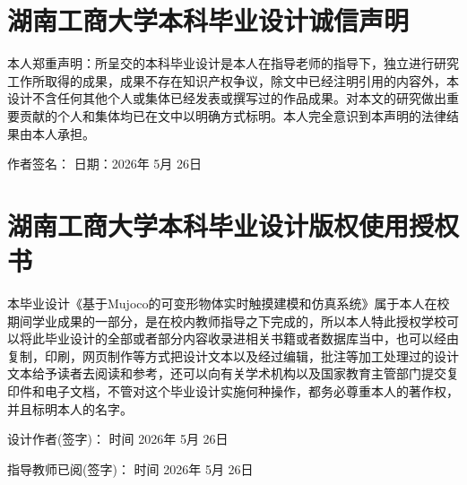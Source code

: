 \section*{湖南工商大学本科毕业设计诚信声明}
本人郑重声明：所呈交的本科毕业设计是本人在指导老师的指导下，独立进行研究工作所取得的成果，成果不存在知识产权争议，除文中已经注明引用的内容外，本设计不含任何其他个人或集体已经发表或撰写过的作品成果。对本文的研究做出重要贡献的个人和集体均已在文中以明确方式标明。本人完全意识到本声明的法律结果由本人承担。

\vspace{1cm}
作者签名：\hspace{2cm} \quad 日期：2026年 5月 26日

\vspace{2cm}
\section*{湖南工商大学本科毕业设计版权使用授权书}
本毕业设计《基于Mujoco的可变形物体实时触摸建模和仿真系统》属于本人在校期间学业成果的一部分，是在校内教师指导之下完成的，所以本人特此授权学校可以将此毕业设计的全部或者部分内容收录进相关书籍或者数据库当中，也可以经由复制，印刷，网页制作等方式把设计文本以及经过编辑，批注等加工处理过的设计文本给予读者去阅读和参考，还可以向有关学术机构以及国家教育主管部门提交复印件和电子文档，不管对这个毕业设计实施何种操作，都务必尊重本人的著作权，并且标明本人的名字。

\vspace{1cm}
设计作者(签字)：\hspace{2cm} \quad 时间 2026年 5月 26日

\vspace{0.5cm}
指导教师已阅(签字)：\hspace{2cm} \quad 时间 2026年 5月 26日